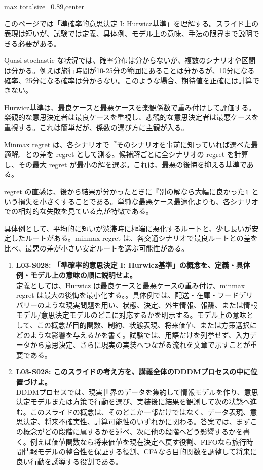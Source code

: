 \begin{minipage}[t]{0.58\textwidth}
\begin{adjustbox}{max totalsize={\textwidth}{0.89\textheight},center}
\begin{minipage}{\textwidth}\scriptsize
{}このページでは「準確率的意思決定 I: Hurwicz基準」を理解する。スライド上の表現は短いが、試験では定義、具体例、モデル上の意味、手法の限界まで説明できる必要がある。\par
Quasi-stochastic な状況では、確率分布は分からないが、複数のシナリオや区間は分かる。例えば旅行時間が10-25分の範囲にあることは分かるが、10分になる確率、25分になる確率は分からない。このような場合、期待値を正確には計算できない。\par
Hurwicz基準は、最良ケースと最悪ケースを楽観係数で重み付けして評価する。楽観的な意思決定者は最良ケースを重視し、悲観的な意思決定者は最悪ケースを重視する。これは簡単だが、係数の選び方に主観が入る。\par
Minmax regret は、各シナリオで『そのシナリオを事前に知っていれば選べた最適解』との差を regret として測る。候補解ごとに全シナリオの regret を計算し、その最大 regret が最小の解を選ぶ。これは、最悪の後悔を抑える基準である。\par
regret の直感は、後から結果が分かったときに『別の解なら大幅に良かった』という損失を小さくすることである。単純な最悪ケース最適化よりも、各シナリオでの相対的な失敗を見ている点が特徴である。\par
具体例として、平均的に短いが渋滞時に極端に悪化するルートと、少し長いが安定したルートがある。minmax regret は、各交通シナリオで最良ルートとの差を比べ、最悪の差が小さい安定ルートを選ぶ可能性がある。\par{}\begin{enumerate}\item \textbf{L03-S028: 「準確率的意思決定 I: Hurwicz基準」の概念を、定義・具体例・モデル上の意味の順に説明せよ。}\\定義としては、Hurwicz は最良ケースと最悪ケースの重み付け、minmax regret は最大の後悔を最小化する。。具体例では、配送・在庫・フードデリバリーのような現実問題を用い、状態、決定、外生情報、報酬、または情報モデル/意思決定モデルのどこに対応するかを明示する。モデル上の意味として、この概念が目的関数、制約、状態表現、将来価値、または方策選択にどのような影響を与えるかを書く。試験では、用語だけを列挙せず、入力データから意思決定、さらに現実の実装へつながる流れを文章で示すことが重要である。\item \textbf{L03-S028: このスライドの考え方を、講義全体のDDDMプロセスの中に位置づけよ。}\\DDDMプロセスでは、現実世界のデータを集約して情報モデルを作り、意思決定モデルまたは方策で行動を選び、実装後に結果を観測して次の状態へ進む。このスライドの概念は、そのどこか一部だけではなく、データ表現、意思決定、将来不確実性、計算可能性のいずれかに関わる。答案では、まずこの概念がどの段階に属するかを述べ、次に他の段階へどう影響するかを書く。例えば価値関数なら将来価値を現在決定へ戻す役割、FIFOなら旅行時間情報モデルの整合性を保証する役割、CFAなら目的関数を調整して将来に良い行動を誘導する役割である。\end{enumerate}

\end{minipage}
\end{adjustbox}
\end{minipage}
